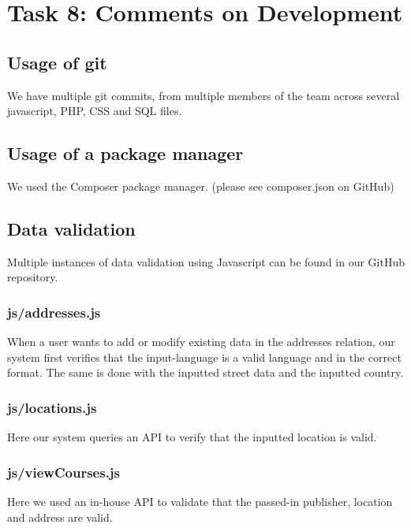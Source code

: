 \documentclass[titlepage]{article}
\begin{document}
\newpage

\section{Task 8: Comments on Development}
\vspace{1em}
\subsection{Usage of git}
We have multiple git commits, from multiple members of the team across several javascript, PHP, CSS and SQL files.
\vspace{1em}
\subsection{Usage of a package manager}
We used the Composer package manager. (please see composer.json on GitHub)
\vspace{1em}
\subsection{Data validation}
Multiple instances of data validation using Javascript can be found in our GitHub repository.
\vspace{1em}
\subsubsection{js/addresses.js}
When a user wants to add or modify existing data in the addresses relation, our system first verifies that the
input-language is a valid language and in the correct format. The same is done with the inputted street data
and the inputted country.
\vspace{1em}
\subsubsection{js/locations.js}
Here our system queries an API to verify that the inputted location is valid.
\vspace{1em}
\subsubsection{js/viewCourses.js}
Here we used an in-house API to validate that the passed-in publisher, location and address are valid.
\vspace{1em}
\end{document}
